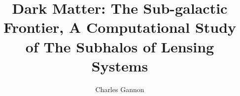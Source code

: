 \documentclass[12pt,chapterheads]{UCMerced}
\begin{document}
\nobibliography* %

\title{Dark Matter: The Sub-galactic Frontier, A Computational Study of The Subhalos of Lensing Systems}

\author{Charles Gannon}





\end{document}
